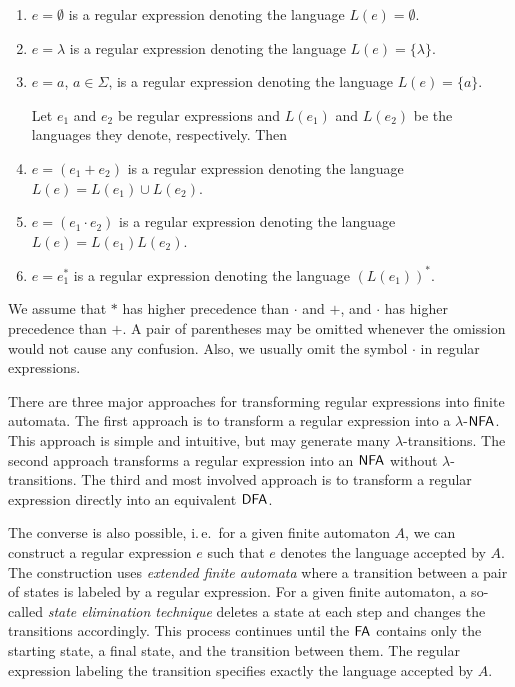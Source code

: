 \begin{enumerate}
\item $e = \emptyset$ is a regular expression denoting the language $L(e) = \emptyset$.
\item $e = \lambda$ is a regular expression denoting the language $L(e) = \{\lambda\}$.
\item $e = a$, $a \in \Sigma$, is a regular expression denoting the language $L(e) = \{a\}$.

Let $e_1$ and $e_2$ be regular expressions and $L(e_1)$ and $L(e_2)$ be the languages they
denote, respectively. Then
\item $e = (e_1 + e_2)$ is a regular expression denoting the language $L(e) = L(e_1) \cup L(e_2)$.
\item $e = (e_1 \cdot e_2)$ is a regular expression denoting the language $L(e) = L(e_1) L(e_2)$.
\item $e = e_1^*$ is a regular expression denoting the language $(L(e_1))^*$.
\end{enumerate}

We assume that $*$ has higher precedence than $\cdot$ and $+$, and $\cdot$ has higher precedence than $+$. A pair of parentheses may be omitted whenever the omission would not cause any confusion. Also, we usually omit the symbol $\cdot$ in regular expressions.

There are three major approaches for transforming regular expressions into finite automata. The first approach is to transform a regular expression into a $\lambda$-$\textup{\sf NFA}$. This approach is simple and intuitive, but may generate many $\lambda$-transitions. The second approach transforms a regular expression into an $\textup{\sf NFA}$ without $\lambda$-transitions. The third and most involved approach is to transform a regular expression directly into an equivalent $\textup{\sf DFA}$.

The converse is also possible, i.\,e.\ for a given finite automaton $A$, we can construct a regular expression $e$ such that $e$ denotes the language accepted by $A$. The construction uses \emph{extended finite automata} where a transition between a pair of states is labeled by a regular expression. For a given finite automaton, a so-called \emph{state elimination technique} deletes a state at each step and changes the transitions accordingly. This process continues until the $\textup{\sf FA}$ contains only the starting state, a final state, and the transition between them. The regular expression labeling the transition specifies exactly the language accepted by $A$.

